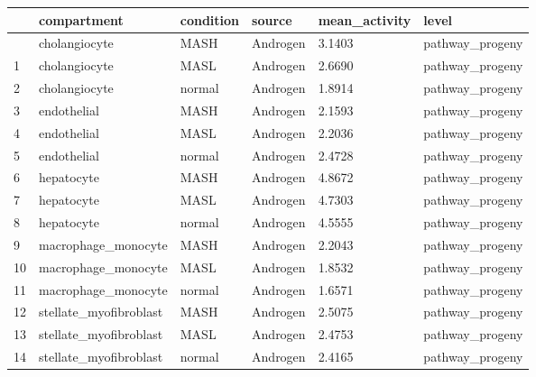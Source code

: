 \documentclass[
  letterpaper,
  DIV=11,
  numbers=noendperiod]{scrartcl}
\newcounter{none} %
\begin{document}
{\def\LTcaptype{none} %
\begin{longtable}[]{@{}llllll@{}}
\toprule\noalign{}
& compartment & condition & source & mean\_activity & level \\
\midrule\noalign{}
\endhead
\bottomrule\noalign{}
\endlastfoot
0 & cholangiocyte & MASH & Androgen & 3.1403 & pathway\_progeny \\
1 & cholangiocyte & MASL & Androgen & 2.6690 & pathway\_progeny \\
2 & cholangiocyte & normal & Androgen & 1.8914 & pathway\_progeny \\
3 & endothelial & MASH & Androgen & 2.1593 & pathway\_progeny \\
4 & endothelial & MASL & Androgen & 2.2036 & pathway\_progeny \\
5 & endothelial & normal & Androgen & 2.4728 & pathway\_progeny \\
6 & hepatocyte & MASH & Androgen & 4.8672 & pathway\_progeny \\
7 & hepatocyte & MASL & Androgen & 4.7303 & pathway\_progeny \\
8 & hepatocyte & normal & Androgen & 4.5555 & pathway\_progeny \\
9 & macrophage\_monocyte & MASH & Androgen & 2.2043 &
pathway\_progeny \\
10 & macrophage\_monocyte & MASL & Androgen & 1.8532 &
pathway\_progeny \\
11 & macrophage\_monocyte & normal & Androgen & 1.6571 &
pathway\_progeny \\
12 & stellate\_myofibroblast & MASH & Androgen & 2.5075 &
pathway\_progeny \\
13 & stellate\_myofibroblast & MASL & Androgen & 2.4753 &
pathway\_progeny \\
14 & stellate\_myofibroblast & normal & Androgen & 2.4165 &
pathway\_progeny \\
\end{longtable}
}
\end{document}
